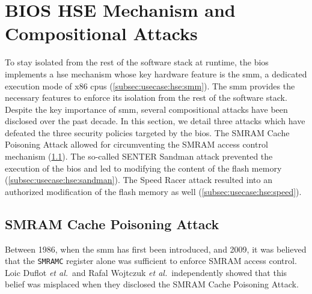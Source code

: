 \section{BIOS HSE Mechanism and Compositional Attacks}
\label{sec:usecase:hse}

To stay isolated from the rest of the software stack at runtime, the \ac{bios}
implements a \ac{hse} mechanism whose key hardware feature is the \ac{smm}, a
dedicated execution mode of x86 \acp{cpu} (\ref{subsec:usecase:hse:smm}).
%
The \ac{smm} provides the necessary features to enforce its isolation from the
rest of the software stack.
%
Despite the key importance of \ac{smm}, several compositional attacks have been
disclosed over the past decade.
%
In this section, we detail three attacks which have defeated the three security
policies targeted by the \ac{bios}.
%
The SMRAM Cache Poisoning Attack allowed for circumventing the SMRAM access
control mechanism (\ref{subsec:usecase:hse:smram}).
%
The so-called SENTER Sandman attack prevented the execution of the \ac{bios} and
led to modifying the content of the flash memory
(\ref{subsec:usecase:hse:sandman}).
%
The Speed Racer attack resulted into an authorized modification of the flash
memory as well (\ref{subsec:usecase:hse:speed}).

\subsection{SMRAM Cache Poisoning Attack} %
\label{subsec:usecase:hse:smram}

Between 1986, when the \ac{smm} has first been introduced, and 2009, it was
believed that the \texttt{SMRAMC} register alone was sufficient to enforce SMRAM
access control.
%
Loic Duflot \emph{et al.}\,\cite{duflot2009smram} and Rafal Wojtczuk \emph{et
  al.}\,\cite{wojtczuk2009smram} independently showed that this belief was
misplaced when they disclosed the SMRAM Cache Poisoning Attack.

